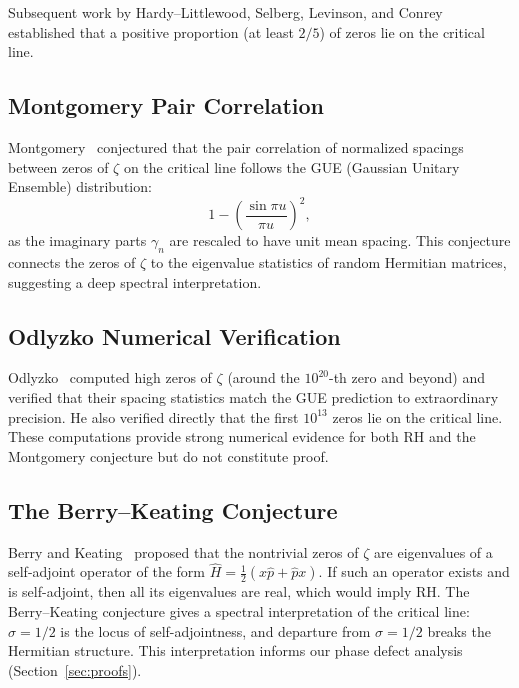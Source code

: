 \documentclass[11pt]{article}
\theoremstyle{remark}
\begin{document}
Subsequent work by Hardy--Littlewood, Selberg, Levinson, and Conrey~\cite{Conrey}
established that a positive proportion (at least $2/5$) of zeros lie on the critical
line.

\subsection{Montgomery Pair Correlation}

Montgomery~\cite{Mont} conjectured that the pair correlation of normalized spacings
between zeros of $\zeta$ on the critical line follows the GUE (Gaussian Unitary
Ensemble) distribution:
\begin{equation}\label{eq:pair-corr}
  1 - \left(\frac{\sin\pi u}{\pi u}\right)^{\!2},
\end{equation}
as the imaginary parts $\gamma_n$ are rescaled to have unit mean spacing.
This conjecture connects the zeros of $\zeta$ to the eigenvalue statistics of random
Hermitian matrices, suggesting a deep spectral interpretation.

\subsection{Odlyzko Numerical Verification}

Odlyzko~\cite{Odl} computed high zeros of $\zeta$ (around the $10^{20}$-th zero and
beyond) and verified that their spacing statistics match the GUE prediction to
extraordinary precision.
He also verified directly that the first $10^{13}$ zeros lie on the critical line.
These computations provide strong numerical evidence for both RH and the Montgomery
conjecture but do not constitute proof.

\subsection{The Berry--Keating Conjecture}

Berry and Keating~\cite{BK} proposed that the nontrivial zeros of $\zeta$ are
eigenvalues of a self-adjoint operator of the form $\hat{H}=\tfrac{1}{2}(x\hat{p}+\hat{p}x)$.
If such an operator exists and is self-adjoint, then all its eigenvalues are real,
which would imply RH.
The Berry--Keating conjecture gives a spectral interpretation of the critical line:
$\sigma=1/2$ is the locus of self-adjointness, and departure from $\sigma=1/2$ breaks
the Hermitian structure.
This interpretation informs our phase defect analysis (Section~\ref{sec:proofs}).
\end{document}

